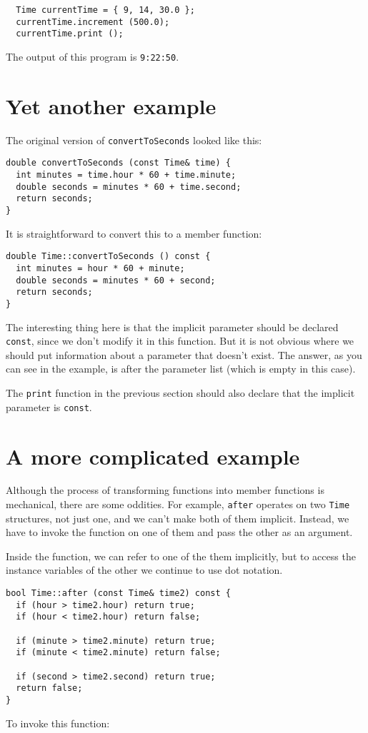 \begin{verbatim}
  Time currentTime = { 9, 14, 30.0 };
  currentTime.increment (500.0);
  currentTime.print ();
\end{verbatim}
%
The output of this program is {\tt 9:22:50}.

\section{Yet another example}

The original version of {\tt convertToSeconds} looked like this:

\begin{verbatim}
double convertToSeconds (const Time& time) {
  int minutes = time.hour * 60 + time.minute;
  double seconds = minutes * 60 + time.second;
  return seconds;
}
\end{verbatim}
%
It is straightforward to convert this to a member function:

\begin{verbatim}
double Time::convertToSeconds () const {
  int minutes = hour * 60 + minute;
  double seconds = minutes * 60 + second;
  return seconds;
}
\end{verbatim}
%
The interesting thing here is that the implicit parameter should
be declared {\tt const}, since we don't modify it in this function.
But it is not obvious where we should put information about a
parameter that doesn't exist.  The answer, as you can see in the
example, is after the parameter list (which is empty in this case).

The {\tt print} function in the previous section should also
declare that the implicit parameter is {\tt const}.

\section {A more complicated example}

Although the process of transforming functions into member
functions is mechanical, there are some oddities.  For example,
{\tt after} operates on two {\tt Time} structures, not just
one, and we can't make both of them implicit.  Instead, we have
to invoke the function on one of them and pass the other as
an argument.

Inside the function, we can refer to one of the them implicitly,
but to access the instance variables of the other we continue
to use dot notation.

\begin{verbatim}
bool Time::after (const Time& time2) const {
  if (hour > time2.hour) return true;
  if (hour < time2.hour) return false;

  if (minute > time2.minute) return true;
  if (minute < time2.minute) return false;

  if (second > time2.second) return true;
  return false;
}
\end{verbatim}
%
To invoke this function:

